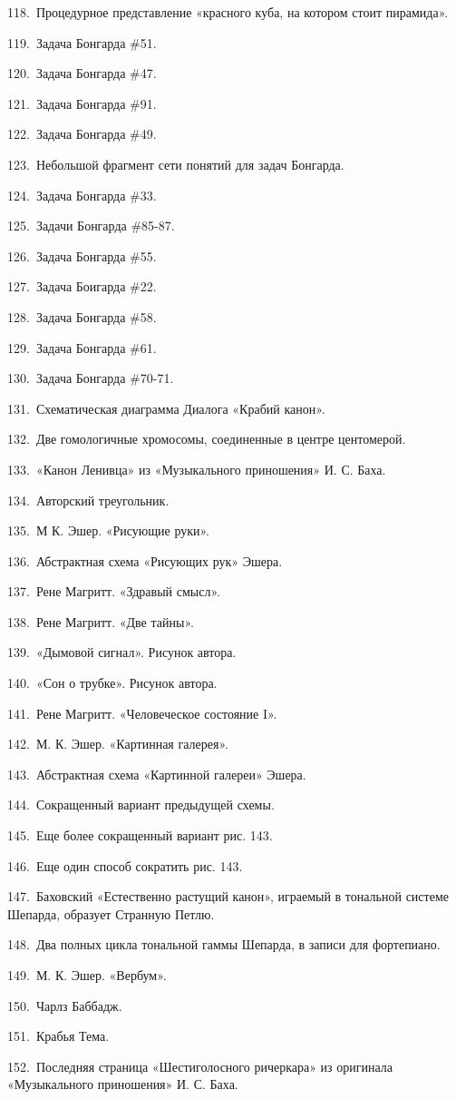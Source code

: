 118.~Процедурное представление «красного куба, на котором стоит пирамида».

119.~Задача Бонгарда \#51.

120.~Задача Бонгарда \#47.

121.~Задача Бонгарда \#91.

122.~Задача Бонгарда \#49.

123.~Небольшой фрагмент сети понятий для задач Бонгарда.

124.~Задача Бонгарда \#33.

125.~Задачи Бонгарда \#85-87.

126.~Задача Бонгарда \#55.

127.~Задача Боигарда \#22.

128.~Задача Бонгарда \#58.

129.~Задача Бонгарда \#61.

130.~Задача Бонгарда \#70-71.

131.~Схематическая диаграмма Диалога «Крабий канон».

132.~Две гомологичные хромосомы, соединенные в центре центомерой.

133.~«Канон Ленивца» из «Музыкального приношения» И. С. Баха.

134.~Авторский треугольник.

135.~М К. Эшер. «Рисующие руки».

136.~Абстрактная схема «Рисующих рук» Эшера.

137.~Рене Магритт. «Здравый смысл».

138.~Рене Магритт. «Две тайны».

139.~«Дымовой сигнал». Рисунок автора.

140.~«Сон о трубке». Рисунок автора.

141.~Рене Магритт. «Человеческое состояние I».

142.~М. К. Эшер. «Картинная галерея».

143.~Абстрактная схема «Картинной галереи» Эшера.

144.~Сокращенный вариант предыдущей схемы.

145.~Еще более сокращенный вариант рис. 143.

146.~Еще один способ сократить рис. 143.

147.~Баховский «Естественно растущий канон», играемый в тональной системе Шепарда, образует Странную Петлю.

148.~Два полных цикла тональной гаммы Шепарда, в записи для фортепиано.

149.~М. К. Эшер. «Вербум».

150.~Чарлз Баббадж.

151.~Крабья Тема.

152.~Последняя страница «Шестиголосного ричеркара» из оригинала «Музыкального приношения» И. С. Баха.

